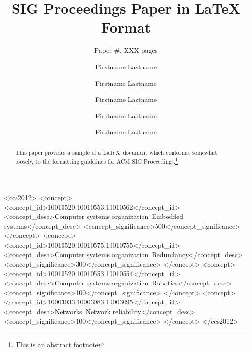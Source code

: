 \documentclass[10pt,sigconf,anonymous]{acmart}
\begin{document}
\title{SIG Proceedings Paper in LaTeX Format}
\subtitle{Paper \#, XXX pages}

\author{Firstname Lastname}

\author{Firstname Lastname}

\author{Firstname Lastname}

\author{Firstname Lastname}

\author{Firstname Lastname}


\renewcommand{\shortauthors}{F. Lastname et al.}


\begin{abstract}
This paper provides a sample of a \LaTeX\ document which conforms,
somewhat loosely, to the formatting guidelines for
ACM SIG Proceedings.\footnote{This is an abstract footnote}
\end{abstract}

%
%
\begin{CCSXML}
<ccs2012>
 <concept>
  <concept_id>10010520.10010553.10010562</concept_id>
  <concept_desc>Computer systems organization~Embedded systems</concept_desc>
  <concept_significance>500</concept_significance>
 </concept>
 <concept>
  <concept_id>10010520.10010575.10010755</concept_id>
  <concept_desc>Computer systems organization~Redundancy</concept_desc>
  <concept_significance>300</concept_significance>
 </concept>
 <concept>
  <concept_id>10010520.10010553.10010554</concept_id>
  <concept_desc>Computer systems organization~Robotics</concept_desc>
  <concept_significance>100</concept_significance>
 </concept>
 <concept>
  <concept_id>10003033.10003083.10003095</concept_id>
  <concept_desc>Networks~Network reliability</concept_desc>
  <concept_significance>100</concept_significance>
 </concept>
</ccs2012>
\end{CCSXML}
\end{document}

